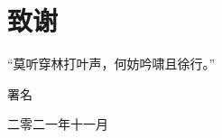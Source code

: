 {\kaishu
\chapter*{致\qquad 谢}
\begin{spacing}{1.37}
	“莫听穿林打叶声，何妨吟啸且徐行。”
\end{spacing}

\vspace{0cm} \hspace{10cm} 

\hfill  署名 \hspace{0cm}

\hfill  二零二一年十一月 \hspace{0cm}
}
